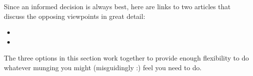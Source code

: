 \documentclass{howto}
\begin{document}
Since an informed decision is always best, here are links to two
articles that discuss the opposing viewpoints in great detail:

\begin{itemize}

\item {}
\item {}

\end{itemize}

The three options in this section work together to provide enough
flexibility to do whatever  munging you might
(misguidingly :) feel you need to do.
\end{document}
